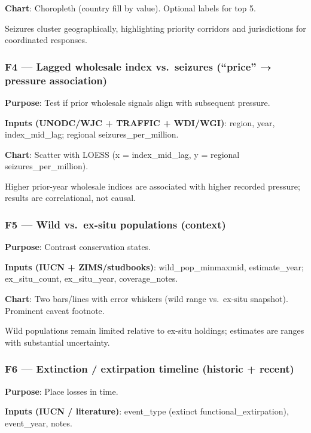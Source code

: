 \documentclass[
]{article}
\begin{document}
\textbf{Chart}: Choropleth (country fill by value). Optional labels for
top 5.

Seizures cluster geographically, highlighting priority corridors and
jurisdictions for coordinated responses.

\subsubsection{F4 --- Lagged wholesale index vs.~seizures (``price'' →
pressure
association)}\label{f4-lagged-wholesale-index-vs.-seizures-price-pressure-association}

\textbf{Purpose}: Test if prior wholesale signals align with subsequent
pressure.

\textbf{Inputs (UNODC/WJC + TRAFFIC + WDI/WGI)}: region, year,
index\_mid\_lag; regional seizures\_per\_million.

\textbf{Chart}: Scatter with LOESS (x = index\_mid\_lag, y = regional
seizures\_per\_million).

Higher prior-year wholesale indices are associated with higher recorded
pressure; results are correlational, not causal.

\subsubsection{F5 --- Wild vs.~ex-situ populations
(context)}\label{f5-wild-vs.-ex-situ-populations-context}

\textbf{Purpose}: Contrast conservation states.

\textbf{Inputs (IUCN + ZIMS/studbooks)}:
wild\_pop\_min\textbar max\textbar mid, estimate\_year; ex\_situ\_count,
ex\_situ\_year, coverage\_notes.

\textbf{Chart}: Two bars/lines with error whiskers (wild range
vs.~ex-situ snapshot). Prominent caveat footnote.

Wild populations remain limited relative to ex-situ holdings; estimates
are ranges with substantial uncertainty.

\subsubsection{F6 --- Extinction / extirpation timeline (historic +
recent)}\label{f6-extinction-extirpation-timeline-historic-recent}

\textbf{Purpose}: Place losses in time.

\textbf{Inputs (IUCN / literature)}: event\_type (extinct \textbar{}
functional\_extirpation), event\_year, notes.
\end{document}
